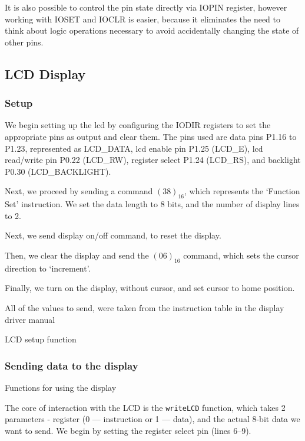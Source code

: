 \documentclass[10pt]{article}
\newcommand{\code}[3]{}
\begin{document}
    It is also possible to control the pin state directly via IOPIN register, however working with IOSET and IOCLR is easier, because it eliminates the need to think about logic operations necessary to avoid accidentally changing the state of other pins.

    \subsection{LCD Display}
    \subsubsection{Setup}
    We begin setting up the lcd by configuring the IODIR registers to set the appropriate pins as output and clear them.
    The pins used are data pins P1.16 to P1.23, represented as {LCD\_DATA}, lcd enable pin P1.25 (LCD\_E), lcd \mbox{read/write} pin P0.22 (LCD\_RW), register select P1.24 (LCD\_RS), and backlight P0.30 (LCD\_BACKLIGHT).

    Next, we proceed by sending a command $(38)_{16}$, which represents the `Function Set' instruction.
    We set the data length to 8 bits, and the number of display lines to 2.

    Next, we send display on/off command, to reset the display.

    Then, we clear the display and send the $(06)_{16}$ command, which sets the cursor direction to `increment'.

    Finally, we turn on the display, without cursor, and set cursor to home position.

    All of the values to send, were taken from the instruction table in the display driver manual \cite[p.24]{display-man}

    \begin{program}[H]
        \code{63}{96}{display.h}
        \caption{LCD setup function}
    \end{program}

    \subsubsection{Sending data to the display}

    \begin{program}[H]
        \code{16}{52}{display.h}
        \caption{Functions for using the display}
        \label{lst:display-util-functions}
    \end{program}

    The core of interaction with the LCD is the \texttt{writeLCD} function, which takes 2 parameters - register (0 --- instruction or 1 --- data),
    and the actual 8-bit data we want to send. 
    We begin by setting the register select pin (lines 6--9).
\end{document}
